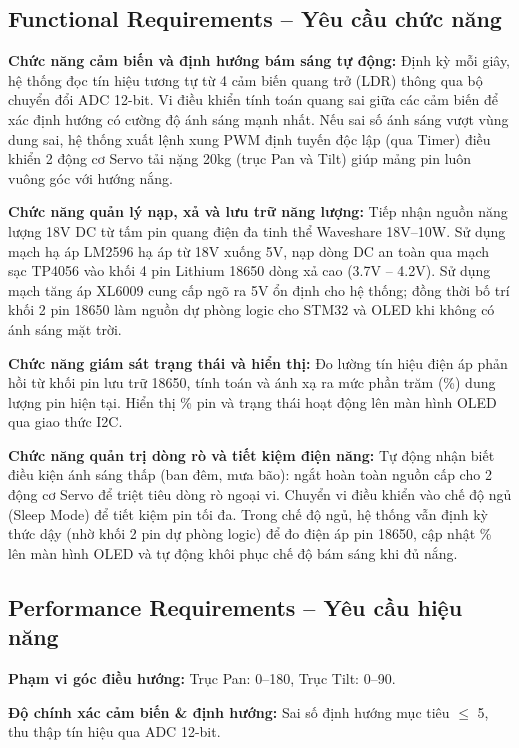 \documentclass[12pt,a4paper]{report}
\begin{document}
\subsection{Functional Requirements -- Yêu cầu chức năng}

\textbf{Chức năng cảm biến và định hướng bám sáng tự động: }Định kỳ mỗi giây, hệ thống đọc tín hiệu tương tự từ 4 cảm biến quang trở (LDR) thông qua bộ chuyển đổi ADC 12-bit. Vi điều khiển tính toán quang sai giữa các cảm biến để xác định hướng có cường độ ánh sáng mạnh nhất. Nếu sai số ánh sáng vượt vùng dung sai, hệ thống xuất lệnh xung PWM định tuyến độc lập (qua Timer) điều khiển 2 động cơ Servo tải nặng 20kg (trục Pan và Tilt) giúp mảng pin luôn vuông góc với hướng nắng.

\textbf{Chức năng quản lý nạp, xả và lưu trữ năng lượng: }Tiếp nhận nguồn năng lượng 18V DC từ tấm pin quang điện đa tinh thể Waveshare 18V--10W. Sử dụng mạch hạ áp LM2596 hạ áp từ 18V xuống 5V, nạp dòng DC an toàn qua mạch sạc TP4056 vào khối 4 pin Lithium 18650 dòng xả cao (3.7V -- 4.2V). Sử dụng mạch tăng áp XL6009 cung cấp ngõ ra 5V ổn định cho hệ thống; đồng thời bố trí khối 2 pin 18650 làm nguồn dự phòng logic cho STM32 và OLED khi không có ánh sáng mặt trời.

\textbf{Chức năng giám sát trạng thái và hiển thị: }Đo lường tín hiệu điện áp phản hồi từ khối pin lưu trữ 18650, tính toán và ánh xạ ra mức phần trăm (\%) dung lượng pin hiện tại. Hiển thị \% pin và trạng thái hoạt động lên màn hình OLED qua giao thức I2C.

\textbf{Chức năng quản trị dòng rò và tiết kiệm điện năng: }Tự động nhận biết điều kiện ánh sáng thấp (ban đêm, mưa bão): ngắt hoàn toàn nguồn cấp cho 2 động cơ Servo để triệt tiêu dòng rò ngoại vi. Chuyển vi điều khiển vào chế độ ngủ (Sleep Mode) để tiết kiệm pin tối đa. Trong chế độ ngủ, hệ thống vẫn định kỳ thức dậy (nhờ khối 2 pin dự phòng logic) để đo điện áp pin 18650, cập nhật \% lên màn hình OLED và tự động khôi phục chế độ bám sáng khi đủ nắng.

\subsection{Performance Requirements -- Yêu cầu hiệu năng}

\textbf{Phạm vi góc điều hướng: }Trục Pan: 0\textdegree{}--180\textdegree{}, Trục Tilt: 0\textdegree{}--90\textdegree{}.

\textbf{Độ chính xác cảm biến \& định hướng: }Sai số định hướng mục tiêu \ensuremath{\le} \textpm{}5\textdegree{}, thu thập tín hiệu qua ADC 12-bit.
\end{document}
